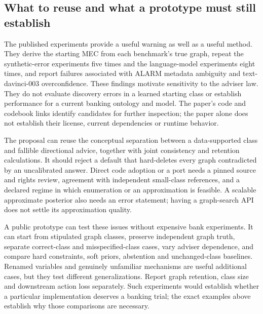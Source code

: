 \subsection{What to reuse and what a prototype must still establish}

The published experiments provide a useful warning as well as a useful method.
They derive the starting MEC from each benchmark's true graph, repeat the
synthetic-error experiments five times and the language-model experiments
eight times, and report failures associated with ALARM metadata ambiguity and
text-davinci-003 overconfidence. These findings motivate sensitivity to the
adviser law. They do not evaluate discovery errors in a learned starting class
or establish performance for a current banking ontology and model. The
paper's code and codebook links identify candidates for further inspection;
the paper alone does not establish their license, current dependencies or
runtime behavior.~\citep{exec17_imperfect_experts}

The proposal can reuse the conceptual separation between a data-supported
class and fallible directional advice, together with joint consistency and
retention calculations. It should reject a default that hard-deletes every
graph contradicted by an uncalibrated answer. Direct code adoption or a port
needs a pinned source and rights review, agreement with independent small-class
references, and a declared regime in which enumeration or an approximation is
feasible. A scalable approximate posterior also needs an error statement;
having a graph-search API does not settle its approximation quality.

A public prototype can test these issues without expensive bank experiments.
It can start from stipulated graph classes, preserve independent graph truth,
separate correct-class and misspecified-class cases, vary adviser dependence,
and compare hard constraints, soft priors, abstention and unchanged-class
baselines. Renamed variables and genuinely unfamiliar mechanisms are useful
additional cases, but they test different generalizations. Report graph
retention, class size and downstream action loss separately. Such experiments
would establish whether a particular implementation deserves a banking trial;
the exact examples above establish why those comparisons are necessary.

\label{exec17:advice-development-end}


